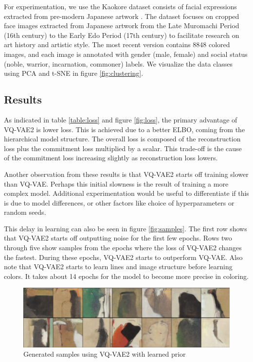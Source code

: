 \documentclass{article}
\begin{document}
For experimentation, we use the Kaokore dataset consists of facial expressions extracted from pre-modern Japanese artwork \cite{kaokore}. The dataset focuses on cropped face images extracted from Japanese artwork from the Late Muromachi Period (16th century) to the Early Edo Period (17th century) to facilitate research on art history and artistic style. The most recent version contains 8848 colored images, and each image is annotated with gender (male, female) and social status (noble, warrior, incarnation, commoner) labels. We visualize the data classes using PCA and t-SNE in figure \ref{fig:clustering}.

\subsection{Results}

As indicated in table \ref{table:loss} and figure \ref{fig:loss}, the primary advantage of VQ-VAE2 is lower loss. This is achieved due to a better ELBO, coming from the hierarchical model structure. The overall loss is composed of the reconstruction loss plus the commitment loss multiplied by a scalar. This trade-off is the cause of the commitment loss increasing slightly as reconstruction loss lowers. 

Another observation from these results is that VQ-VAE2 starts off training slower than VQ-VAE. Perhaps this initial slowness is the result of training a more complex model. Additional experimentation would be useful to differentiate if this is due to model differences, or other factors like choice of hyperparameters or random seeds. 

This delay in learning can also be seen in figure \ref{fig:samples}. The first row shows that VQ-VAE2 starts off outputting noise for the first few epochs. Rows two through five show samples from the epochs where the loss of VQ-VAE2 changes the fastest. During these epochs, VQ-VAE2 starts to outperform VQ-VAE. Also note that VQ-VAE2 starts to learn lines and image structure before learning colors. It takes about 14 epochs for the model to become more precise in coloring.

\begin{figure}
    \centering
    \includegraphics[width=0.7\linewidth]{generations.png}
    \caption{Generated samples using VQ-VAE2 with learned prior}
    \label{fig:generations}
\end{figure}
\end{document}
